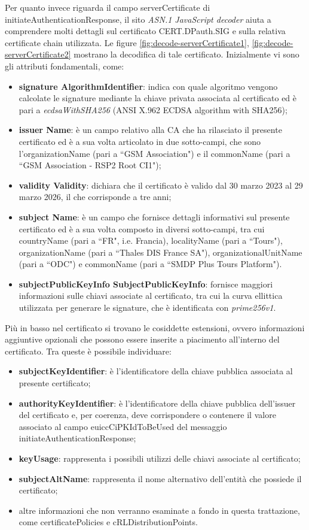 \documentclass[10pt, oneside]{book}
\begin{document}
\noindent Per quanto invece riguarda il campo serverCertificate di initiateAuthenticationResponse, il sito \textit{ASN.1 JavaScript decoder} aiuta a comprendere molti dettagli sul certificato CERT.DPauth.SIG e sulla relativa certificate chain utilizzata. Le figure \ref{fig:decode-serverCertificate1}, \ref{fig:decode-serverCertificate2} mostrano la decodifica di tale certificato. Inizialmente vi sono gli attributi fondamentali, come:
\begin{itemize}
\item \textbf{signature AlgorithmIdentifier}: indica con quale algoritmo vengono calcolate le signature mediante la chiave privata associata al certificato ed è pari a \textit{ecdsaWithSHA256} (ANSI X.962 ECDSA algorithm with SHA256);
\item \textbf{issuer Name}: è un campo relativo alla CA che ha rilasciato il presente certificato ed è a sua volta articolato in due sotto-campi, che sono l'organizationName (pari a ``GSM Association") e il commonName (pari a ``GSM Association - RSP2 Root CI1");
\item \textbf{validity Validity}: dichiara che il certificato è valido dal 30 marzo 2023 al 29 marzo 2026, il che corrisponde a tre anni;
\item \textbf{subject Name}: è un campo che fornisce dettagli informativi sul presente certificato ed è a sua volta composto in diversi sotto-campi, tra cui countryName (pari a ``FR", i.e. Francia), localityName (pari a ``Tours"), organizationName (pari a ``Thales DIS France SA"), organizationalUnitName (pari a ``ODC") e commonName (pari a ``SMDP Plus Tours Platform").
\item \textbf{subjectPublicKeyInfo SubjectPublicKeyInfo}: fornisce maggiori informazioni sulle chiavi associate al certificato, tra cui la curva ellittica utilizzata per generare le signature, che è identificata con \textit{prime256v1}.
\end{itemize}
Più in basso nel certificato si trovano le cosiddette estensioni, ovvero informazioni aggiuntive opzionali che possono essere inserite a piacimento all'interno del certificato. Tra queste è possibile individuare:
\begin{itemize}
\item \textbf{subjectKeyIdentifier}: è l'identificatore della chiave pubblica associata al presente certificato;
\item \textbf{authorityKeyIdentifier}: è l'identificatore della chiave pubblica dell'issuer del certificato e, per coerenza, deve corrispondere o contenere il valore associato al campo euiccCiPKIdToBeUsed del messaggio initiateAuthenticationResponse;
\item \textbf{keyUsage}: rappresenta i possibili utilizzi delle chiavi associate al certificato;
\item \textbf{subjectAltName}: rappresenta il nome alternativo dell'entità che possiede il certificato;
\item altre informazioni che non verranno esaminate a fondo in questa trattazione, come certificatePolicies e cRLDistributionPoints.
\end{itemize}
\end{document}

